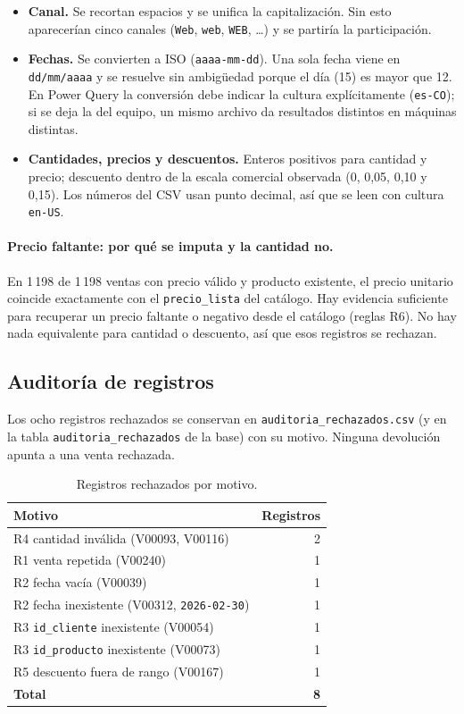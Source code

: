 \documentclass[11pt,letterpaper]{article}
\begin{document}
\begin{itemize}
  \item \textbf{Canal.} Se recortan espacios y se unifica la capitalización. Sin esto aparecerían cinco canales
        (\texttt{Web}, \texttt{web\textvisiblespace}, \texttt{WEB}, \dots) y se partiría la participación.
  \item \textbf{Fechas.} Se convierten a ISO (\texttt{aaaa-mm-dd}). Una sola fecha viene en \texttt{dd/mm/aaaa}
        y se resuelve sin ambigüedad porque el día (15) es mayor que 12. En Power Query la conversión debe
        indicar la cultura explícitamente (\texttt{es-CO}); si se deja la del equipo, un mismo archivo da
        resultados distintos en máquinas distintas.
  \item \textbf{Cantidades, precios y descuentos.} Enteros positivos para cantidad y precio; descuento dentro
        de la escala comercial observada (0, 0,05, 0,10 y 0,15). Los números del CSV usan punto decimal, así que
        se leen con cultura \texttt{en-US}.
\end{itemize}

\paragraph{Precio faltante: por qué se imputa y la cantidad no.} En 1\,198 de 1\,198 ventas con precio válido y
producto existente, el precio unitario coincide exactamente con el \texttt{precio\_lista} del catálogo. Hay
evidencia suficiente para recuperar un precio faltante o negativo desde el catálogo (reglas R6). No hay nada
equivalente para cantidad o descuento, así que esos registros se rechazan.

\subsection{Auditoría de registros}

Los ocho registros rechazados se conservan en \texttt{auditoria\_\allowbreak rechazados.csv} (y en la tabla
\texttt{auditoria\_\allowbreak rechazados} de la base) con su motivo. Ninguna devolución apunta a una venta rechazada.

\begin{table}[H]
\centering
\caption{Registros rechazados por motivo.}
\begin{tabularx}{0.8\linewidth}{L r}
\toprule
Motivo & Registros \\
\midrule
R4 cantidad inválida (V00093, V00116) & 2 \\
R1 venta repetida (V00240) & 1 \\
R2 fecha vacía (V00039) & 1 \\
R2 fecha inexistente (V00312, \texttt{2026-02-30}) & 1 \\
R3 \texttt{id\_cliente} inexistente (V00054) & 1 \\
R3 \texttt{id\_producto} inexistente (V00073) & 1 \\
R5 descuento fuera de rango (V00167) & 1 \\
\midrule
\textbf{Total} & \textbf{8} \\
\bottomrule
\end{tabularx}
\end{table}
\end{document}
